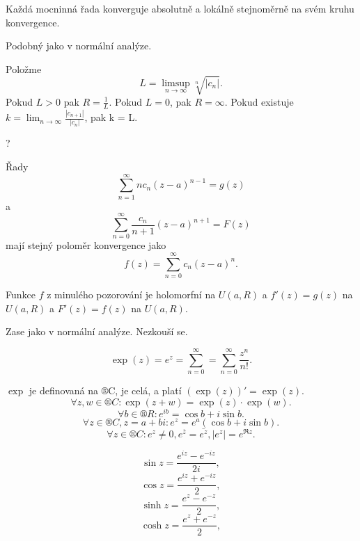 \documentclass[12pt]{article}					%
\begin{document}
\begin{veta}
	Každá mocninná řada konverguje absolutně a lokálně stejnoměrně na svém kruhu konvergence.

	\begin{dukazin}
		Podobný jako v normální analýze.
	\end{dukazin}
\end{veta}

\begin{veta}
	Položme
	$$ L = \limsup_{n \rightarrow ∞} \sqrt[n]{|c_n|}. $$
	Pokud $L > 0$ pak $R = \frac{1}{L}$. Pokud $L = 0$, pak $R = ∞$. Pokud existuje $k = \lim_{n \rightarrow ∞} \frac{|c_{n+1}|}{|c_n|}$, pak k = L.

	\begin{dukazin}
		?
	\end{dukazin}
\end{veta}

\begin{pozorovani}
	Řady
	$$ \sum_{n=1}^∞ n c_n (z - a)^{n-1} = g(z) $$
	a
	$$ \sum_{n=0}^∞ \frac{c_n}{n+1} (z - a)^{n+1} = F(z) $$
	mají stejný poloměr konvergence jako
	$$ f(z) = \sum_{n=0}^∞ c_n (z - a)^n. $$
\end{pozorovani}

\begin{veta}
	Funkce $f$ z minulého pozorování je holomorfní na $U(a, R)$ a $f'(z) = g(z)$ na $U(a, R)$ a $F'(z) = f(z)$ na $U(a, R)$.

	\begin{dukazin}
		Zase jako v normální analýze. Nezkouší se.
	\end{dukazin}
\end{veta}

\begin{definice}
	$$ \exp(z) = e^z = \sum_{n = 0}^∞ = \sum_{n=0}^∞ \frac{z^n}{n!}. $$
	
	\begin{poznamkain}[Vlastnosti]
		$\exp$ je definovaná na ®C, je celá, a platí $(\exp(z))' = \exp(z)$.
		$$ \forall z, w \in ®C: \exp(z + w) = \exp(z)·\exp(w). $$
		$$ \forall b \in ®R: e^{ib} = \cos b + i\sin b. $$
		$$ \forall z \in ®C, z = a + bi: e^z = e^a(\cos b + i \sin b). $$
		$$ \forall z \in ®C: e^z ≠ 0, e^{\overline{z}} = \overline{e^z}, |e^z| = e^{\Re z}. $$
	\end{poznamkain}
\end{definice}

\begin{definice}
	$$ \sin z = \frac{e^{iz} - e^{-iz}}{2i}, $$
	$$ \cos z = \frac{e^{iz} + e^{-iz}}{2}, $$
	$$ \sinh z = \frac{e^{z} - e^{-z}}{2}, $$
	$$ \cosh z = \frac{e^{z} + e^{-z}}{2}, $$
	
\end{definice}
\end{document}
